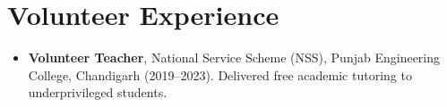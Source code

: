 \documentclass[11pt,a4paper,sans]{moderncv}
\begin{document}

\section{Volunteer Experience}
\vspace{1pt}
\begin{itemize}
\item{\textbf{Volunteer Teacher}, National Service Scheme (NSS), Punjab Engineering College, Chandigarh (2019--2023). Delivered free academic tutoring to underprivileged students.}
\end{itemize}
\end{document}
